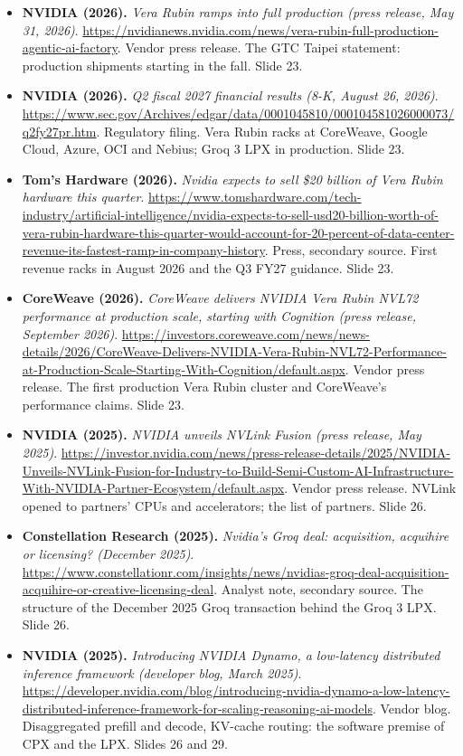 \begin{itemize}[leftmargin=1.2em,itemsep=3pt]
\item \textbf{NVIDIA (2026).} \textit{Vera Rubin ramps into full production (press release, May 31, 2026)}. \url{https://nvidianews.nvidia.com/news/vera-rubin-full-production-agentic-ai-factory}. Vendor press release. The GTC Taipei statement: production shipments starting in the fall. Slide 23.
\item \textbf{NVIDIA (2026).} \textit{Q2 fiscal 2027 financial results (8-K, August 26, 2026)}. \url{https://www.sec.gov/Archives/edgar/data/0001045810/000104581026000073/q2fy27pr.htm}. Regulatory filing. Vera Rubin racks at CoreWeave, Google Cloud, Azure, OCI and Nebius; Groq 3 LPX in production. Slide 23.
\item \textbf{Tom's Hardware (2026).} \textit{Nvidia expects to sell \$20 billion of Vera Rubin hardware this quarter}. \url{https://www.tomshardware.com/tech-industry/artificial-intelligence/nvidia-expects-to-sell-usd20-billion-worth-of-vera-rubin-hardware-this-quarter-would-account-for-20-percent-of-data-center-revenue-its-fastest-ramp-in-company-history}. Press, secondary source. First revenue racks in August 2026 and the Q3 FY27 guidance. Slide 23.
\item \textbf{CoreWeave (2026).} \textit{CoreWeave delivers NVIDIA Vera Rubin NVL72 performance at production scale, starting with Cognition (press release, September 2026)}. \url{https://investors.coreweave.com/news/news-details/2026/CoreWeave-Delivers-NVIDIA-Vera-Rubin-NVL72-Performance-at-Production-Scale-Starting-With-Cognition/default.aspx}. Vendor press release. The first production Vera Rubin cluster and CoreWeave's performance claims. Slide 23.
\item \textbf{NVIDIA (2025).} \textit{NVIDIA unveils NVLink Fusion (press release, May 2025)}. \url{https://investor.nvidia.com/news/press-release-details/2025/NVIDIA-Unveils-NVLink-Fusion-for-Industry-to-Build-Semi-Custom-AI-Infrastructure-With-NVIDIA-Partner-Ecosystem/default.aspx}. Vendor press release. NVLink opened to partners' CPUs and accelerators; the list of partners. Slide 26.
\item \textbf{Constellation Research (2025).} \textit{Nvidia's Groq deal: acquisition, acquihire or licensing? (December 2025)}. \url{https://www.constellationr.com/insights/news/nvidias-groq-deal-acquisition-acquihire-or-creative-licensing-deal}. Analyst note, secondary source. The structure of the December 2025 Groq transaction behind the Groq 3 LPX. Slide 26.
\item \textbf{NVIDIA (2025).} \textit{Introducing NVIDIA Dynamo, a low-latency distributed inference framework (developer blog, March 2025)}. \url{https://developer.nvidia.com/blog/introducing-nvidia-dynamo-a-low-latency-distributed-inference-framework-for-scaling-reasoning-ai-models}. Vendor blog. Disaggregated prefill and decode, KV-cache routing: the software premise of CPX and the LPX. Slides 26 and 29.
\end{itemize}
